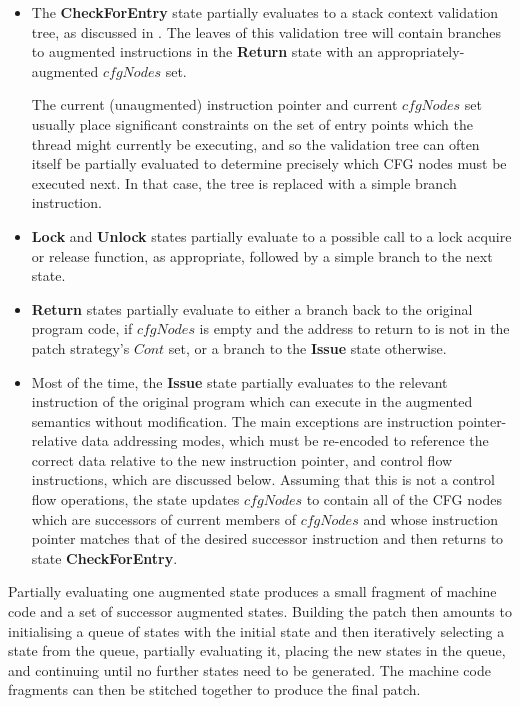 \begin{itemize}
\item The \textbf{CheckForEntry} state partially evaluates to a stack
  context validation tree, as discussed in .  The leaves of
  this validation tree will contain branches to augmented instructions
  in the \textbf{Return} state with an appropriately-augmented
  $cfgNodes$ set.

  The current (unaugmented) instruction pointer and current $cfgNodes$
  set usually place significant constraints on the set of entry points
  which the thread might currently be executing, and so the validation
  tree can often itself be partially evaluated to determine precisely
  which CFG nodes must be executed next.  In that case, the tree is
  replaced with a simple branch instruction.
\item \textbf{Lock} and \textbf{Unlock} states partially evaluate to a
  possible call to a lock acquire or release function, as appropriate,
  followed by a simple branch to the next state.
\item \textbf{Return} states partially evaluate to either a branch
  back to the original program code, if $cfgNodes$ is empty and the
  address to return to is not in the patch strategy's $Cont$ set, or a
  branch to the \textbf{Issue} state otherwise.
\item Most of the time, the \textbf{Issue} state partially evaluates
  to the relevant instruction of the original program which can
  execute in the augmented semantics without modification.  The main
  exceptions are instruction pointer-relative data addressing modes,
  which must be re-encoded to reference the correct data relative to
  the new instruction pointer, and control flow instructions, which
  are discussed below.  Assuming that this is not a control flow
  operations, the state updates $cfgNodes$ to contain all of the CFG
  nodes which are successors of current members of $cfgNodes$ and
  whose instruction pointer matches that of the desired successor
  instruction and then returns to state \textbf{CheckForEntry}.
\end{itemize}

Partially evaluating one augmented state produces a small fragment of
machine code and a set of successor augmented states.  Building the
patch then amounts to initialising a queue of states with the initial
state and then iteratively selecting a state from the queue, partially
evaluating it, placing the new states in the queue, and continuing
until no further states need to be generated.  The machine code
fragments can then be stitched together to produce the final patch.

